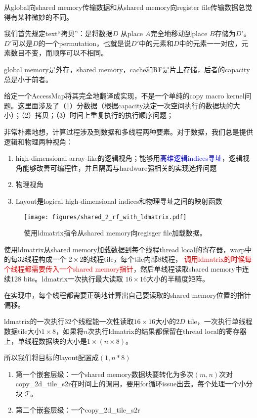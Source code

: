 从global向shared memory传输数据和从shared memory向register file传输数据总觉得有某种微妙的不同。

我们首先规定\colorbox{hl}{text}“拷贝”：是将数据$D$ 从place $A$完全地移动到place $B$存储为$D'$。$D'$可以是$D$的一个permutation，也就是说$D'$中的元素和$D$中的元素一一对应，元素数目不变，而顺序可以不相同。

global memory是外存，shared memory，cache和RF是片上存储，后者的capacity总是小于前者。

给定一个AccessMap将其完全地翻译成实现，不是一个单纯的copy macro kernel问题。这里面涉及了（1）分数据（根据capacity决定一次空间执行的数据块的大小）；（2）拷贝；（3）时间上重复执行的执行顺序问题；

非常朴素地想，计算过程涉及到数据和多线程两种要素。对于数据，我们总是提供逻辑和物理两种视角：
\begin{enumerate}
    \setlength{\itemsep}{-0.1cm}
    \item high-dimensional array-like的\colorbox{hl}{逻辑视角}；能够用\textcolor{blue}{高维逻辑indices寻址}，逻辑视角能够改善可编程性，并且隔离与hardware强相关的实现选择问题
    \item \colorbox{hl}{物理视角}
    \item Layout是logical high-dimensional indices和物理寻址之间的映射函数
\end{enumerate}

\begin{figure}[h]
    \centering
    \texttt{[image: figures/shared\_2\_rf\_with\_ldmatrix.pdf]}
    \caption{使用ldmatrix指令从shared memory向regisger file加载数据。}
\end{figure}

使用ldmatrix从shared memory加载数据到每个线程thread local的寄存器，warp中的每32线程构成一个 $2 \times 2$的线程tile，每个tile内部8线程，
\textcolor{red}{调用ldmatrix的时候每个线程都需要传入一个shared memory指针}，然后单线程读取shared memory中连续128 bits。ldmatrix一次执行最大读取 $16 \times 16$大小的半精度矩阵。

在实现中，每个线程都需要正确地计算出自己要读取的shared memory位置的指针偏移。

ldmatrix的一次执行32个线程能一次性读取$16 \times 16$大小的$2D$ tile，一次执行单线程数据tile大小$1 \times 8$，如果将$n$次执行ldmatrix的结果都保留在thread local的寄存器上，单线程数据块的大小是$1 \times \left( n \times 8 \right)$。

所以我们将目标的layout配置成$(1, n*8)$

\newpage

\begin{enumerate}
    \setlength{\itemsep}{-0.1cm}
    \item 第一个嵌套层级：一个shared memory数据块要转化为多次$(m, n)$次对copy\_2d\_tile\_s2r在时间上的调用，要用for循环issue出去。每个处理一个小分块 $\mathcal{T}$。
    \item 第二个嵌套层级：一个copy\_2d\_tile\_s2r
\end{enumerate}